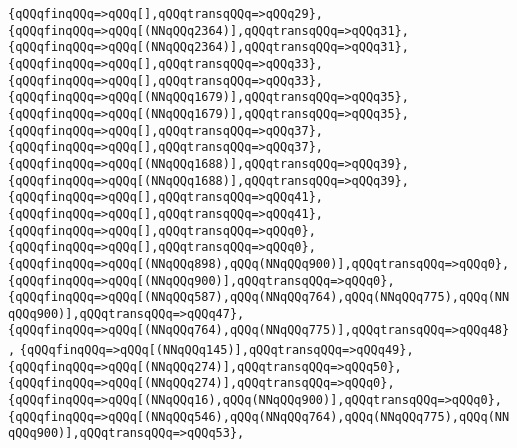 \verb|{qQQqfinqQQq=>qQQq[],qQQqtransqQQq=>qQQq29},|\newline
\verb|{qQQqfinqQQq=>qQQq[(NNqQQq2364)],qQQqtransqQQq=>qQQq31},|\newline
\verb|{qQQqfinqQQq=>qQQq[(NNqQQq2364)],qQQqtransqQQq=>qQQq31},|\newline
\verb|{qQQqfinqQQq=>qQQq[],qQQqtransqQQq=>qQQq33},|\newline
\verb|{qQQqfinqQQq=>qQQq[],qQQqtransqQQq=>qQQq33},|\newline
\verb|{qQQqfinqQQq=>qQQq[(NNqQQq1679)],qQQqtransqQQq=>qQQq35},|\newline
\verb|{qQQqfinqQQq=>qQQq[(NNqQQq1679)],qQQqtransqQQq=>qQQq35},|\newline
\verb|{qQQqfinqQQq=>qQQq[],qQQqtransqQQq=>qQQq37},|\newline
\verb|{qQQqfinqQQq=>qQQq[],qQQqtransqQQq=>qQQq37},|\newline
\verb|{qQQqfinqQQq=>qQQq[(NNqQQq1688)],qQQqtransqQQq=>qQQq39},|\newline
\verb|{qQQqfinqQQq=>qQQq[(NNqQQq1688)],qQQqtransqQQq=>qQQq39},|\newline
\verb|{qQQqfinqQQq=>qQQq[],qQQqtransqQQq=>qQQq41},|\newline
\verb|{qQQqfinqQQq=>qQQq[],qQQqtransqQQq=>qQQq41},|\newline
\verb|{qQQqfinqQQq=>qQQq[],qQQqtransqQQq=>qQQq0},|\newline
\verb|{qQQqfinqQQq=>qQQq[],qQQqtransqQQq=>qQQq0},|\newline
\verb|{qQQqfinqQQq=>qQQq[(NNqQQq898),qQQq(NNqQQq900)],qQQqtransqQQq=>qQQq0},|\newline
\verb|{qQQqfinqQQq=>qQQq[(NNqQQq900)],qQQqtransqQQq=>qQQq0},|\newline
\verb|{qQQqfinqQQq=>qQQq[(NNqQQq587),qQQq(NNqQQq764),qQQq(NNqQQq775),qQQq(NNqQQq900)],qQQqtransqQQq=>qQQq47},|\newline
\verb|{qQQqfinqQQq=>qQQq[(NNqQQq764),qQQq(NNqQQq775)],qQQqtransqQQq=>qQQq48},|\newline
\verb|{qQQqfinqQQq=>qQQq[(NNqQQq145)],qQQqtransqQQq=>qQQq49},|\newline
\verb|{qQQqfinqQQq=>qQQq[(NNqQQq274)],qQQqtransqQQq=>qQQq50},|\newline
\verb|{qQQqfinqQQq=>qQQq[(NNqQQq274)],qQQqtransqQQq=>qQQq0},|\newline
\verb|{qQQqfinqQQq=>qQQq[(NNqQQq16),qQQq(NNqQQq900)],qQQqtransqQQq=>qQQq0},|\newline
\verb|{qQQqfinqQQq=>qQQq[(NNqQQq546),qQQq(NNqQQq764),qQQq(NNqQQq775),qQQq(NNqQQq900)],qQQqtransqQQq=>qQQq53},|\newline
